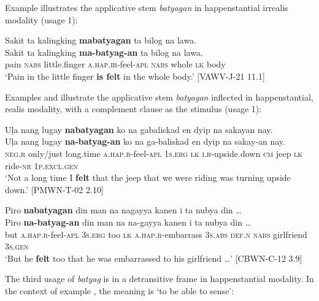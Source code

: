 Example  illustrates the applicative stem \textit{batyagan} in happenstantial irrealis  modality (usage 1):

\ea
\label{ex:wholebody}
Sakit  ta  kalingking  \textbf{mabatyagan}  ta  bilog  na  lawa. \\\smallskip
\gll Sakit  ta  kalingking  \textbf{ma-batyag-an}  ta  bilog  na  lawa. \\
pain  \textsc{nabs}  little.finger  \textsc{a.hap.ir}-feel-\textsc{apl}  \textsc{nabs}  whole  \textsc{lk}  body \\
\glt ‘Pain in the little finger \textbf{is felt} in the whole body.’  [VAWV-J-21 11.1]
\z

Examples  and  illustrate the applicative stem \textit{batyagan} inflected in happenstantial, realis modality, with a complement clause as the stimulus (usage 1):

\newpage

\ea
\label{bkm:Ref121399507}
Uļa  nang  lugay  \textbf{nabatyagan}  ko  na  gabaliskad en  dyip  na  sakayan  nay. \\\smallskip
\gll Uļa  nang  lugay  \textbf{na-batyag-an}  ko  na  ga-baliskad en  dyip  na  sakay-an  nay. \\
\textsc{neg.r}  only/just  long.time  \textsc{a.hap.r}-feel-\textsc{apl}  1\textsc{s.erg}  \textsc{lk}  \textsc{i.r}-upside.down
\textsc{cm}   jeep  \textsc{lk}  ride-\textsc{nr}  1\textsc{p.excl.gen} \\
\glt `Not a long time I \textbf{felt} that the jeep that we were riding was turning upside down.’ [PMWN-T-02  2.10]
\z

\ea
\label{bkm:Ref123389246}
Piro  \textbf{nabatyagan}  din  man  na  nagayya  kanen  i ta  nubya  din  … \\\smallskip
\gll Piro  \textbf{na-batyag-an}  din  man  na  na-gayya  kanen  i ta  nubya  din  … \\
but  \textsc{a.hap.r}-feel-\textsc{apl}  3\textsc{s.erg}  too  \textsc{lk}  \textsc{a.hap.r}-embarrass  3\textsc{s.abs}  \textsc{def.n}
\textsc{nabs}  girlfriend  3\textsc{s.gen} \\
\glt `But he \textbf{felt} too that he was embarrassed to his girlfriend  …’ [CBWN-C-12 3.9]
\z

The third usage of \textit{batyag} is in a detransitive frame in happenstantial modality. In the  context of example , the meaning is ‘to be able to sense’: \\


